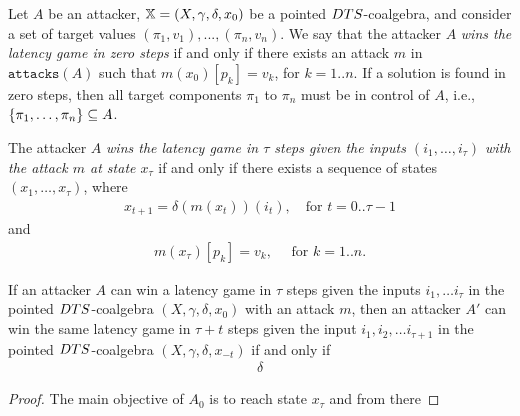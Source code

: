 \begin{definition}
Let $A$ be an  attacker, ${\mathbb{X}}=(X,\gamma,\delta,x_0)$ be a pointed $DTS$-coalgebra, and consider a set of target values $(\pi_1,v_1),...,(\pi_n,v_n)$. We say that the attacker $A$ \emph{wins the latency game in zero steps} if and only if there exists an attack $m$ in $\texttt{attacks}(A)$ such that $m(x_0)[p_k]=v_k$, for $k=1..n$. If a solution is found in zero steps, then all target components $\pi_1$ to $\pi_n$ must be in control of $A$, i.e., $\left\{\pi_1, \ldots, \pi_n\right\}\subseteq A$.

The attacker $A$ \emph{wins the latency game in $\tau$ steps given the inputs $(i_1, \ldots, i_\tau)$ with the attack $m$ at state $x_{\tau}$} if and only if there exists a sequence of states $(x_1, \ldots, x_\tau)$, where
\begin{align}
x_{t+1}=\delta(m (x_{t}))(i_t), \quad \text{for $t=0..{\tau-1}$}
\end{align}
and
\begin{align}
m(x_\tau)[p_k]=v_k,\quad \text{ for $k=1..n$.}
\end{align}
\end{definition}


\begin{proposition}
If an attacker $A$ can win a latency game in $\tau$ steps given the inputs $i_1, \ldots i_{\tau}$ in the pointed $DTS$-coalgebra $(X,\gamma,\delta, x_{0})$ with an attack $m$, then an attacker $A'$ can win the same latency game in $\tau+t$ steps given the input $i_1, i_2, \ldots i_{\tau+1}$ in the pointed $DTS$-coalgebra $(X,\gamma,\delta, x_{-t})$ if and only if 
\begin{align}
\delta
\end{align}

\end{proposition}
\begin{proof}
The main objective of $A_0$ is to reach state $x_{\tau}$ and from there 
\end{proof}


